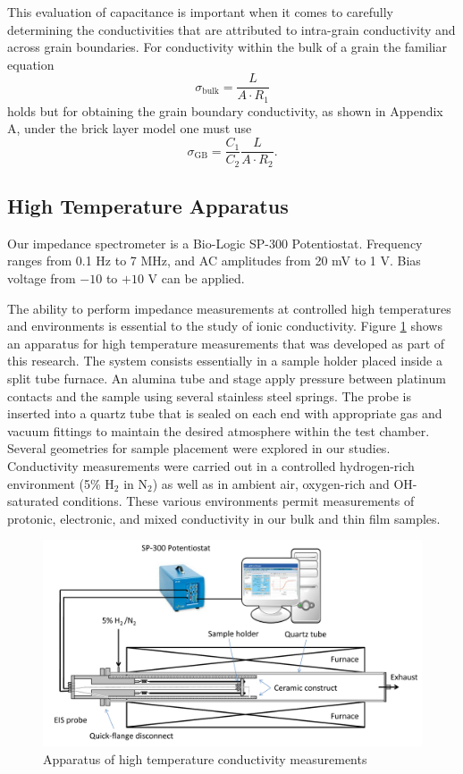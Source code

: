 This evaluation of capacitance is important when it comes to carefully determining the conductivities that are attributed to intra-grain conductivity and across grain boundaries. For conductivity within the bulk of a grain the familiar equation 
\begin{equation}
    \sigma_{\mathrm{bulk}} = \frac{L}{A\cdot R_1}
\end{equation}
holds but for obtaining the grain boundary conductivity, as shown in Appendix A, under the brick layer model one must use
\begin{equation}
    \sigma_{\mathrm{GB}} =  \frac{C_1}{C_2}\frac{L}{A \cdot R_2}.
\end{equation}

\vspace{12pt}
\subsection{High Temperature Apparatus}

Our impedance spectrometer is a Bio-Logic SP-300 Potentiostat. Frequency ranges from 0.1 Hz to 7 MHz, and AC amplitudes from 20 mV to 1 V. Bias voltage from $-10$ to $+10$ V can be applied.   

The ability to perform impedance measurements at controlled high temperatures and environments is essential to the study of ionic conductivity. Figure \ref{fig:probostat} shows an apparatus for high temperature measurements that was developed as part of this research. The system consists essentially in a sample holder placed inside a split tube furnace. An alumina tube and stage apply pressure between platinum contacts and the sample using several stainless steel springs. The probe is inserted into a quartz tube that is sealed on each end with appropriate gas and vacuum fittings to maintain the desired atmosphere within the test chamber. Several geometries for sample placement were explored in our studies. Conductivity measurements were carried out in a controlled hydrogen-rich environment (5\% H$_2$ in N$_2$) as well as in ambient air, oxygen-rich and OH-saturated conditions. These various environments permit measurements of protonic, electronic, and mixed conductivity in our bulk and thin film samples. 

\begin{figure}
\centering
\includegraphics[width=\linewidth]{Figures/probostat.pdf}
\caption[High temperature electrical characterization apparatus]{Apparatus of high temperature conductivity measurements}
\label{fig:probostat}
\end{figure}

